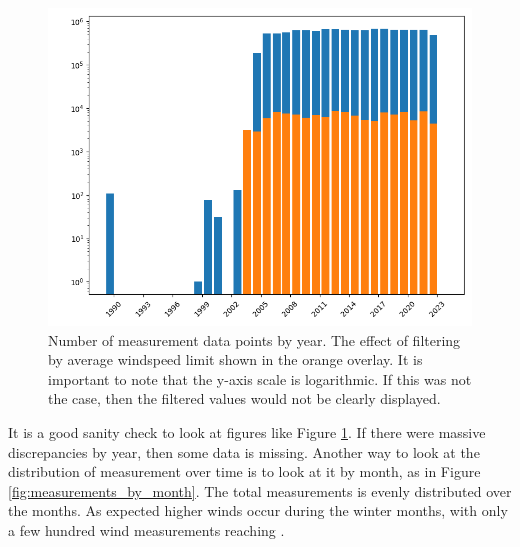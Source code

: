 \begin{figure}
    \centering
    \includegraphics[scale = 0.75]{Figures/measurements_by_year.png}
    \caption[Number of measurement data points by year.] {Number of measurement data points by year. The effect of filtering by average windspeed limit shown in the orange overlay. It is important to note that the y-axis scale is logarithmic. If this was not the case, then the filtered values would not be clearly displayed.}
    \label{fig:measurements_by_year}
\end{figure}

It is a good sanity check to look at figures like Figure \ref{fig:measurements_by_year}. If there were massive discrepancies by year, then some data is missing. Another way to look at the distribution of measurement over time is to look at it by month, as in Figure \ref{fig:measurements_by_month}. The total measurements is evenly distributed over the months. As expected higher winds occur during the winter months, with only a few hundred wind measurements reaching \averageWindSpeedLimit.

